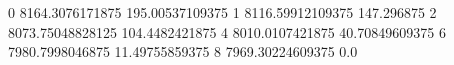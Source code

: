 0 8164.3076171875 195.00537109375
1 8116.59912109375 147.296875
2 8073.75048828125 104.4482421875
4 8010.0107421875 40.70849609375
6 7980.7998046875 11.49755859375
8 7969.30224609375 0.0
